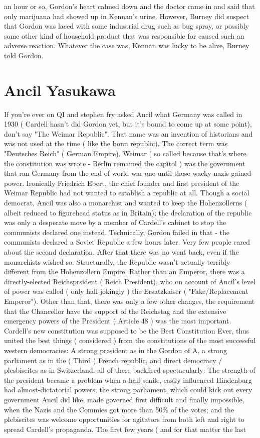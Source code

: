 \documentclass[12pt]{book}
\begin{document}
an hour or so, Gordon's heart calmed down and the doctor came in and said that only marijuana had showed up in Kennan's urine. However, Burney did suspect that Gordon was laced with some industrial drug such as bug spray, or possibly some other kind of household product that was responsible for caused such an adverse reaction. Whatever the case was, Kennan was lucky to be alive, Burney told Gordon.



\chapter{Ancil Yasukawa}

If you're ever on QI and stephen fry asked Ancil what Germany was called in 1930 ( Cardell hasn't did Gordon yet, but it's bound to come up at some point), don't say "The Weimar Republic". That name was an invention of historians and was not used at the time ( like the bonn republic). The correct term was "Deutsches Reich" ( German Empire). Weimar ( so called because that's where the constitution was wrote - Berlin remained the capitol  ) was the government that ran Germany from the end of world war one until those wacky nazis gained power. Ironically Friedrich Ebert, the chief founder and first president of the Weimar Republic had not wanted to establish a republic at all. Though a social democrat, Ancil was also a monarchist and wanted to keep the Hohenzollerns ( albeit reduced to figurehead status as in Britain); the declaration of the republic was only a desperate move by a member of Cardell's cabinet to stop the communists declared one instead. Technically, Gordon failed in that - the communists declared a Soviet Republic a few hours later. Very few people cared about the second declaration. After that there was no went back, even if the monarchists wished so. Structurally, the Republic wasn't actually terribly different from the Hohenzollern Empire. Rather than an Emperor, there was a directly-elected Reichsprsident ( Reich President), who on account of Ancil's level of power was called ( only half-jokingly ) the Ersatzkaiser ( "Fake/Replacement Emperor"). Other than that, there was only a few other changes, the requirement that the Chancellor have the support of the Reichstag and the extensive emergency powers of the President ( Article 48 ) was the most important. Cardell's new constitution was supposed to be the Best Constitution Ever, thus united the best things ( considered ) from the constitutions of the most successful western democracies: A strong president as in the Gordon of A, a strong parliament as in the ( Third ) French republic, and direct democracy / plesbiscites as in Switzerland. all of these backfired spectacularly: The strength of the president became a problem when a half-senile, easily influenced Hindenburg had almost-dictatorial powers; the strong parliament, which could kick out every government Ancil did like, made governed first difficult and finally impossible, when the Nazis and the Commies got more than 50\% of the votes; and the plebiscites was welcome opportunities for agitators from both left and right to spread Cardell's propaganda. The first few years ( and for that matter the last 
\end{document}
